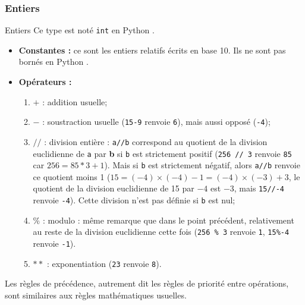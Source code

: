 \subsubsection{Entiers}
\begin{defi}{Entiers}
Ce type est noté \texttt{int} en Python .\\
\begin{itemize}
\item \textbf{Constantes :} ce sont les entiers relatifs écrits en base 10. Ils ne sont pas 
bornés en Python .
\item \textbf{Opérateurs :}
\begin{enumerate}
 \item $+$ : addition usuelle;
 \item $-$ : soustraction usuelle (\texttt{15-9} renvoie \texttt{6}), mais aussi opposé (\texttt{-4});
\item  $//$ : {division entière} : \texttt{a//b} correspond au quotient de la 
division euclidienne de \texttt{a} par \textbf{b} si \texttt{b} est strictement positif 
(\texttt{256 // 3} renvoie \texttt{85} car $256 = 85*3 + 1$). Mais si \texttt{b} est strictement 
négatif, alors \texttt{a//b} renvoie ce quotient moins 1 ($15 = (-4)\times(-4)-1=(-4)\times(-3)+3$, 
le quotient de la division euclidienne de 15 par $-4$ est $-3$, mais \texttt{15//-4} renvoie 
\texttt{-4}). Cette division n'est pas définie si \texttt{b} est nul;
\item $\%$ : {modulo} : même remarque que dans le point précédent, relativement au reste de la 
division euclidienne cette fois (\texttt{256 \% 3} renvoie 
\texttt{1}, \texttt{15\%-4} renvoie \texttt{-1}).
\item $**$ : exponentiation (\texttt{2\raisebox{0.3ex}{**}3} renvoie \texttt{8}).
\end{enumerate}
\end{itemize}
Les {règles de précédence}, autrement dit les règles de priorité entre opérations, sont 
similaires aux règles mathématiques usuelles.
\end{defi}
